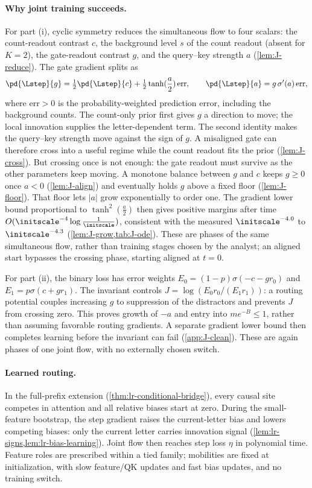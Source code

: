 \paragraph{Why joint training succeeds.} For part (i), cyclic symmetry reduces the simultaneous flow to four scalars: the count-readout contrast $c$,
the background level $s$ of the count readout (absent for $K=2$), the gate-readout contrast $g$, and the query--key strength $a$
(\cref{lem:J-reduce}). The gate gradient splits as
\[
 \pd{\Lstep}{g}=\tfrac{1}{2}\pd{\Lstep}{c}+\tfrac{1}{2}\tanh(\frac{a}{2})\,\mathrm{err},\qquad \pd{\Lstep}{a}=g\,\sigma'(a)\,\mathrm{err},
\]
where $\mathrm{err}>0$ is the probability-weighted prediction error, including the background counts. The count-only prior first
gives $g$ a direction to move; the local innovation supplies the letter-dependent term. The second identity makes the query--key
strength move against the sign of $g$. A misaligned gate can therefore cross into a useful regime while the count readout fits the
prior (\cref{lem:J-cross}). But crossing once is not enough: the gate readout must survive as the other parameters keep moving.
A monotone balance between $g$ and $c$ keeps $g\ge0$ once $a<0$ (\cref{lem:J-align}) and eventually holds $g$ above a fixed floor
(\cref{lem:J-floor}). That floor lets $|a|$ grow exponentially to order one. The gradient lower bound proportional to
$\tanh^2(\frac{a}{2})$ then gives positive margins after time $O(\initscale^{-4}\log\frac{1}{\initscale})$, consistent with the measured
$\initscale^{-4.0}$ to $\initscale^{-4.3}$ (\cref{lem:J-grow,tab:J-ode}). These are phases of the same simultaneous flow, rather than
training stages chosen by the analyst; an aligned start bypasses the crossing phase, starting aligned at $t=0$.

For part (ii), the binary loss has error weights $E_0=(1-p)\sigma(-c-gr_0)$ and $E_1=p\sigma(c+gr_1)$.
The invariant controls $J=\log(E_0r_0/(E_1r_1))$: a routing potential couples increasing $g$ to suppression of the distractors
and prevents $J$ from crossing zero. This proves growth of $-a$ and entry into $me^{-B}\le1$, rather than assuming favorable routing gradients.
A separate gradient lower bound then completes learning before the invariant can fail
(\cref{app:J-clean}). These are again phases of one joint flow, with no externally chosen switch.

\paragraph{Learned routing.}
In the full-prefix extension (\cref{thm:lr-conditional-bridge}), every causal site competes in attention
and all relative biases start at zero. During the small-feature bootstrap, the step gradient raises
the current-letter bias and lowers competing biases: only the current letter carries innovation
signal (\cref{lem:lr-signs,lem:lr-bias-learning}). Joint flow then reaches step loss $\eta$ in
polynomial time. Feature roles are prescribed within a tied family; mobilities are fixed at
initialization, with slow feature/QK updates and fast bias updates, and no training switch.


